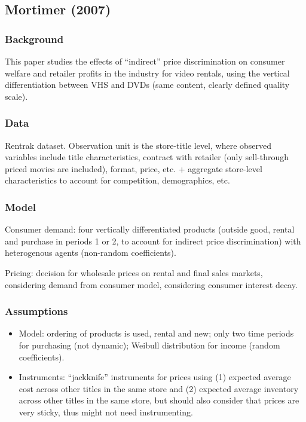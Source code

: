 \subsection{Mortimer (2007)}

\subsubsection{Background}

This paper studies the effects of ``indirect'' price discrimination on consumer welfare and retailer profits in the industry for video rentals, using the vertical differentiation between VHS and DVDs (same content, clearly defined quality scale). 

\subsubsection{Data}

Rentrak dataset. Observation unit is the store-title level, where observed variables include title characteristics, contract with retailer (only sell-through priced movies are included), format, price, etc. + aggregate store-level characteristics to account for competition, demographics, etc.

\subsubsection{Model}

Consumer demand: four vertically differentiated products (outside good, rental and purchase in periods 1 or 2, to account for indirect price discrimination) with heterogenous agents (non-random coefficients).

Pricing: decision for wholesale prices on rental and final sales markets, considering demand from consumer model, considering consumer interest decay.

\subsubsection{Assumptions}

\begin{itemize}
\item Model: ordering of products is used, rental and new; only two time periods for purchasing (not dynamic); Weibull distribution for income (random coefficients).
\item Instruments: ``jackknife'' instruments for prices using (1) expected average cost across other titles in the same store and (2) expected average inventory across other titles in the same store, but should also consider that prices are very sticky, thus might not need instrumenting.
\end{itemize}

